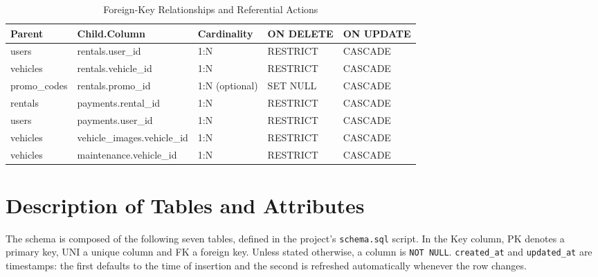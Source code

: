 \documentclass[10pt,a4paper]{report}
\newcommand{\col}[1]{\texttt{#1}}
\begin{document}
\begin{table}[htbp]
\centering
\small
\caption{Foreign-Key Relationships and Referential Actions}
\label{tab:fk}
\begin{tabular}{@{}lllll@{}}
\toprule
\textbf{Parent} & \textbf{Child.Column} & \textbf{Cardinality} & \textbf{ON DELETE} & \textbf{ON UPDATE} \\
\midrule
users        & rentals.user\_id          & 1:N            & RESTRICT & CASCADE \\
vehicles     & rentals.vehicle\_id       & 1:N            & RESTRICT & CASCADE \\
promo\_codes & rentals.promo\_id         & 1:N (optional) & SET NULL & CASCADE \\
rentals      & payments.rental\_id       & 1:N            & RESTRICT & CASCADE \\
users        & payments.user\_id         & 1:N            & RESTRICT & CASCADE \\
vehicles     & vehicle\_images.vehicle\_id & 1:N          & RESTRICT & CASCADE \\
vehicles     & maintenance.vehicle\_id   & 1:N            & RESTRICT & CASCADE \\
\bottomrule
\end{tabular}
\end{table}

\section{Description of Tables and Attributes}
The schema is composed of the following seven tables, defined in the project's \col{schema.sql} script. In the Key column, PK denotes a primary key, UNI a unique column and FK a foreign key. Unless stated otherwise, a column is \col{NOT NULL}. \col{created_at} and \col{updated_at} are timestamps: the first defaults to the time of insertion and the second is refreshed automatically whenever the row changes.
\end{document}
